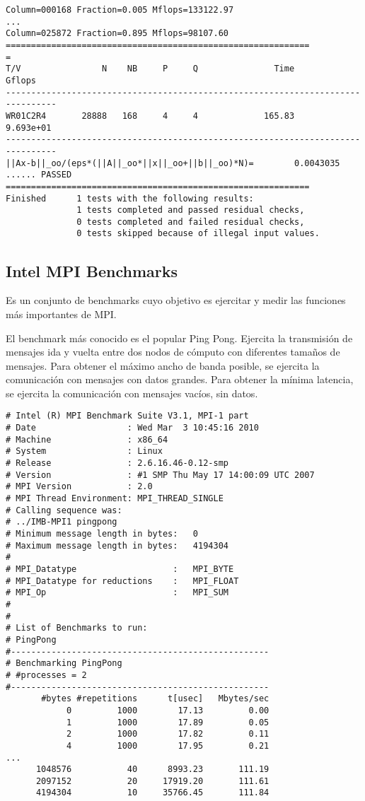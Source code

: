 \documentclass[a4paper]{report}
\begin{document}
\begin{verbatim}
Column=000168 Fraction=0.005 Mflops=133122.97
...
Column=025872 Fraction=0.895 Mflops=98107.60
============================================================
=
T/V                N    NB     P     Q               Time                 Gflops
--------------------------------------------------------------------------------
WR01C2R4       28888   168     4     4             165.83              9.693e+01
--------------------------------------------------------------------------------
||Ax-b||_oo/(eps*(||A||_oo*||x||_oo+||b||_oo)*N)=        0.0043035 ...... PASSED
============================================================
Finished      1 tests with the following results:
              1 tests completed and passed residual checks,
              0 tests completed and failed residual checks,
              0 tests skipped because of illegal input values.
\end{verbatim}

\subsection{Intel MPI Benchmarks}

Es un conjunto de benchmarks cuyo objetivo es ejercitar y medir las funciones m\'as importantes de MPI.

El benchmark m\'as conocido es el popular Ping Pong. Ejercita la transmisi\'on de mensajes ida y vuelta entre dos
nodos de c\'omputo con diferentes tama\~nos de mensajes.
Para obtener el m\'aximo ancho de banda posible, se ejercita la comunicaci\'on con mensajes con datos grandes.
Para obtener la m\'inima latencia, se ejercita la comunicaci\'on con mensajes vac\'ios, sin datos.

\begin{verbatim}
# Intel (R) MPI Benchmark Suite V3.1, MPI-1 part
# Date                  : Wed Mar  3 10:45:16 2010
# Machine               : x86_64
# System                : Linux
# Release               : 2.6.16.46-0.12-smp
# Version               : #1 SMP Thu May 17 14:00:09 UTC 2007
# MPI Version           : 2.0
# MPI Thread Environment: MPI_THREAD_SINGLE
# Calling sequence was:
# ../IMB-MPI1 pingpong
# Minimum message length in bytes:   0
# Maximum message length in bytes:   4194304
#
# MPI_Datatype                   :   MPI_BYTE
# MPI_Datatype for reductions    :   MPI_FLOAT
# MPI_Op                         :   MPI_SUM
#
#
# List of Benchmarks to run:
# PingPong
#---------------------------------------------------
# Benchmarking PingPong
# #processes = 2
#---------------------------------------------------
       #bytes #repetitions      t[usec]   Mbytes/sec
            0         1000        17.13         0.00
            1         1000        17.89         0.05
            2         1000        17.82         0.11
            4         1000        17.95         0.21
...
      1048576           40      8993.23       111.19
      2097152           20     17919.20       111.61
      4194304           10     35766.45       111.84
\end{verbatim}
\end{document}
